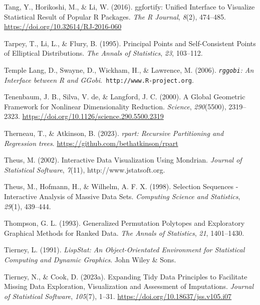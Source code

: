 \documentclass[
  letterpaper,
]{krantz}
\newlength{\cslhangindent}
\newenvironment{CSLReferences}[2] %
 {\begin{list}{}{%
  \setlength{\itemindent}{0pt}
  \setlength{\leftmargin}{0pt}
  \setlength{\parsep}{0pt}
  \ifodd #1
   \setlength{\leftmargin}{\cslhangindent}
   \setlength{\itemindent}{-1\cslhangindent}
  \fi
  \setlength{\itemsep}{#2\baselineskip}}}
 {\end{list}}
\begin{document}
\begin{CSLReferences}{1}{0}
Tang, Y., Horikoshi, M., \& Li, W. (2016). {ggfortify}: {U}nified
{I}nterface to {V}isualize {S}tatistical {R}esult of {P}opular {R}
{P}ackages. \emph{The R Journal}, \emph{8}(2), 474--485.
\url{https://doi.org/10.32614/RJ-2016-060}

Tarpey, T., Li, L., \& Flury, B. (1995). Principal {P}oints and
{S}elf-{C}onsistent {P}oints of {E}lliptical {D}istributions. \emph{The
Annals of Statistics}, \emph{23}, 103--112.

Temple Lang, D., Swayne, D., Wickham, H., \& Lawrence, M. (2006).
\emph{{\texttt{rggobi}}: {A}n {I}nterface between {R} and
{GG}obi}.{\texttt{\ http://www.R-project.org}}.

Tenenbaum, J. B., Silva, V. de, \& Langford, J. C. (2000). A {G}lobal
{G}eometric {F}ramework for {N}onlinear {D}imensionality {R}eduction.
\emph{Science}, \emph{290}(5500), 2319--2323.
\url{https://doi.org/10.1126/science.290.5500.2319}

Therneau, T., \& Atkinson, B. (2023). \emph{{rpart}: {R}ecursive
{P}artitioning and {R}egression trees}.
\url{https://github.com/bethatkinson/rpart}

Theus, M. (2002). Interactive {D}ata {V}isualization {U}sing {M}ondrian.
\emph{Journal of Statistical Software}, \emph{7}(11),
http://www.jstatsoft.org.

Theus, M., Hofmann, H., \& Wilhelm, A. F. X. (1998). Selection
{S}equences - {I}nteractive {A}nalysis of {M}assive {D}ata {S}ets.
\emph{Computing Science and Statistics}, \emph{29}(1), 439--444.

Thompson, G. L. (1993). Generalized {P}ermutation {P}olytopes and
{E}xploratory {G}raphical {M}ethods for {R}anked {D}ata. \emph{The
Annals of Statistics}, \emph{21}, 1401--1430.

Tierney, L. (1991). \emph{{L}isp{S}tat: {A}n {O}bject-{O}rientated
{E}nvironment for {S}tatistical {C}omputing and {D}ynamic {G}raphics}.
John Wiley \& Sons.

Tierney, N., \& Cook, D. (2023a). Expanding {T}idy {D}ata {P}rinciples
to {F}acilitate {M}issing {D}ata {E}xploration, {V}isualization and
{A}ssessment of {I}mputations. \emph{Journal of Statistical Software},
\emph{105}(7), 1--31. \url{https://doi.org/10.18637/jss.v105.i07}


\end{CSLReferences}
\end{document}
